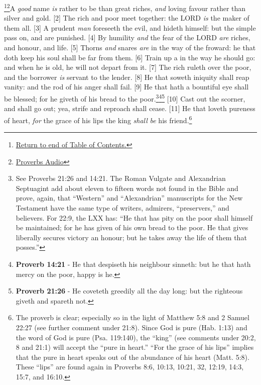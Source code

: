 \footnote{\textcolor[cmyk]{0.99998,1,0,0}{\hyperlink{TOC}{Return to end of Table of Contents.}}}\footnote{\href{https://audiobible.com/bible/proverbs_22.html}{\textcolor[cmyk]{0.99998,1,0,0}{Proverbs Audio}}}\textcolor[cmyk]{0.99998,1,0,0}{A \emph{good} name \emph{is} rather to be  than great riches, \emph{and} loving favour rather than silver and gold.}
[2] \textcolor[cmyk]{0.99998,1,0,0}{The rich and poor meet together: the LORD \emph{is} the maker of them all.}
[3] \textcolor[cmyk]{0.99998,1,0,0}{A prudent \emph{man} foreseeth the evil, and hideth himself: but the simple pass on, and are punished.}
[4] \textcolor[cmyk]{0.99998,1,0,0}{By humility \emph{and} the fear of the LORD \emph{are} riches, and honour, and life.}
[5] \textcolor[cmyk]{0.99998,1,0,0}{Thorns \emph{and} snares \emph{are} in the way of the froward: he that doth keep his soul shall be far from them.}
[6] \textcolor[cmyk]{0.99998,1,0,0}{Train up a  in the way he should go: and when he is old, he will not depart from it.}
[7] \textcolor[cmyk]{0.99998,1,0,0}{The rich ruleth over the poor, and the borrower \emph{is} servant to the lender.}
[8] \textcolor[cmyk]{0.99998,1,0,0}{He that soweth iniquity shall reap vanity: and the rod of his anger shall fail.}
[9] \textcolor[cmyk]{0.99998,1,0,0}{He that hath a bountiful eye shall be blessed; for he giveth of his bread to the poor.}\footnote{See Proverbs 21:26 and 14:21. The Roman Vulgate and Alexandrian Septuagint add about eleven to fifteen words not found in the Bible and prove, again, that “Western” and “Alexandrian” manuscripts for the New Testament have the same type of writers, admirers, “preservers,” and believers. For 22:9, the LXX has: ``He that has pity on the poor shall himself be maintained; for he has given of his own bread to the poor. He that gives liberally secures victory an honour; but he takes away the life of them that posses.''}\footnote{\textbf{Proverb 14:21} - He that despiseth his neighbour sinneth: but he that hath mercy on the poor, happy is he.}\footnote{\textbf{Proverb 21:26} - He coveteth greedily all the day long: but the righteous giveth and spareth not.}
[10] \textcolor[cmyk]{0.99998,1,0,0}{Cast out the scorner, and  shall go out; yea, strife and reproach shall cease.}
[11] \textcolor[cmyk]{0.99998,1,0,0}{He that loveth pureness of heart, \emph{for} the grace of his lips the king \emph{shall} \emph{be} his friend.}\footnote{The proverb is clear; especially so in the light of Matthew 5:8 and 2 Samuel 22:27 (see further comment under 21:8). Since God is pure (Hab. 1:13) and the word of God is pure (Psa. 119:140), the “king” (see comments under 20:2, 8 and 21:1) will accept the “pure in heart.” “For the grace of his lips” implies that the pure in heart speaks out of the abundance of his heart (Matt. 5:8). These “lips” are found again in Proverbs 8:6, 10:13, 10:21, 32, 12:19, 14:3, 15:7, and 16:10.}
